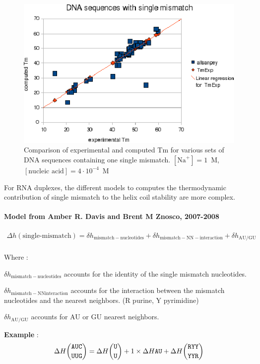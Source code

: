 \documentclass{article}
\begin{document}
\begin{figure}[h]
\includegraphics[width=1\linewidth]{images/DNASingleMismatch}
\caption{Comparison of experimental and computed Tm for various sets of
 DNA sequences containing one single mismatch. $[\mbox{Na}^+] = 1$~M, $[\mbox{nucleic acid}] = 4\cdot{}10^{-4}$~M}
\end{figure}

For RNA duplexes, the different models to computes the thermodynamic contribution of single mismatch to the helix coil 
stability are more complex.


\paragraph{\textbf{Model from Amber R. Davis and Brent M Znosco, 2007-2008}}

\begin{multline*}
\Delta h {(\mbox{single-mismatch})} = 
\delta{}h_\mathrm{mismatch-nucleotides} +
\delta{}h_\mathrm{mismatch-NN-interaction} +
\delta{}h_\mathrm{AU/GU} \\
\end{multline*}

Where :

$\delta{}h_\mathrm{mismatch-nucleotides}$ accounts for the identity of the single mismatch nucleotides.

$\delta{}h_\mathrm{mismatch-NN interaction}$ accounts for the interaction between the mismatch nucleotides and 
the nearest neighbors. (R purine, Y pyrimidine)

$\delta{}h_\mathrm{AU/GU}$ accounts for AU or GU nearest neighbors.

\textbf{Example} :
\begin{multline*}
\Delta H {\mbox{\texttt{AUC}} \choose \mbox{\texttt{UUG}}} = 
\Delta H {\mbox{\texttt{U}} \choose \mbox{\texttt{U}} } + 
1 \times \Delta H {\mbox{\texttt{AU}} } +
\Delta H {\mbox{\texttt{RYY}} \choose \mbox{\texttt{YYR}} } \\
\end{multline*}
\end{document}
